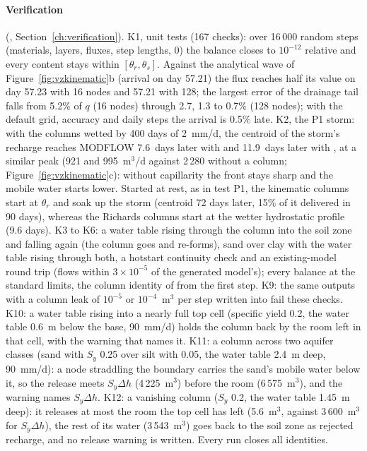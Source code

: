 \paragraph{Verification} (, Section~\ref{ch:verification}).
K1, unit tests (167 checks): over 16\,000 random steps (materials, layers, fluxes, step lengths,  0) the
balance closes to $10^{-12}$ relative and every content stays within $[\theta_r,\theta_s]$. Against the analytical wave of
Figure~\ref{fig:vzkinematic}b (arrival on day 57.21) the flux reaches half its value on day 57.23 with 16 nodes and 57.21 with
128; the largest error of the drainage tail falls from 5.2\% of $q$ (16 nodes) through 2.7, 1.3 to 0.7\% (128 nodes); with
the default grid, accuracy and daily steps the arrival is 0.5\% late.
K2, the P1 storm: with the columns wetted by 400 days of 2~mm/d, the centroid of the storm's recharge reaches MODFLOW
7.6~days later with  and 11.9~days later with , at a similar peak (921 and 995~m$^3$/d
against 2\,280 without a column; Figure~\ref{fig:vzkinematic}c): without capillarity the front stays sharp and the
mobile water starts lower. Started at rest, as in test P1, the kinematic columns start at $\theta_r$ and soak up the
storm (centroid 72 days later, 15\% of it delivered in 90 days), whereas the Richards columns start at the wetter
hydrostatic profile (9.6 days).
K3 to K6: a water table rising through the column into the soil zone and falling again (the column goes and re-forms),
sand over clay with the water table rising through both, a hotstart continuity check and an existing-model round trip
(flows within $3\times10^{-5}$ of the generated model's); every balance at the standard limits, the column identity of
 from the first step. K9: the same outputs with a column leak of $10^{-5}$ or $10^{-4}$~m$^3$ per step
written into  fail these checks. K10: a water table rising into a nearly full top cell (specific yield
0.2, the water table 0.6~m below the base, 90~mm/d) holds the column back by the room left in that cell, with the warning
that names it. K11: a column across two aquifer classes (sand with $S_y$ 0.25 over silt with 0.05, the water table 2.4~m
deep, 90~mm/d): a node straddling the boundary carries the sand's mobile water below it, so the release meets
$S_y\Delta h$ (4\,225~m$^3$) before the room (6\,575~m$^3$), and the warning names $S_y\Delta h$. K12: a vanishing column
($S_y$ 0.2, the water table 1.45~m deep): it releases at most the room the top cell has left (5.6~m$^3$, against
3\,600~m$^3$ for $S_y\Delta h$), the rest of its water (3\,543~m$^3$) goes back to the soil zone as rejected recharge,
and no release warning is written. Every run closes all identities.

